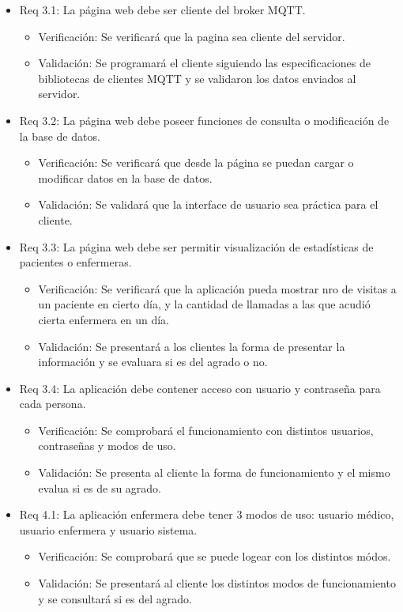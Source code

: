 \documentclass[
11pt, %
]{charter}
\begin{document}
\begin{itemize}
\item Req 3.1: La página web debe ser cliente del broker MQTT.
	\begin{itemize}
	\item Verificación: Se verificará que la pagina sea cliente del servidor.
	\item Validación:  Se programará el cliente siguiendo las especificaciones de bibliotecas de clientes MQTT y se validaron los datos enviados al servidor.
	\end{itemize}
\item Req 3.2: La página web debe poseer funciones de consulta o modificación de la base de datos.
	\begin{itemize}
	\item Verificación: Se verificará que desde la página se puedan cargar o modificar datos en la base de datos.
	\item Validación:  Se validará que la interface de usuario sea práctica para el cliente.
	\end{itemize}
\item Req 3.3: La página web debe ser permitir visualización de estadísticas de pacientes o enfermeras. 
	\begin{itemize}
	\item Verificación: Se verificará que la aplicación pueda mostrar nro de visitas a un paciente en cierto día, y la cantidad de llamadas a las que acudió cierta enfermera en un día.
	\item Validación:  Se presentará a los clientes la forma de presentar la información y se evaluara si es del agrado o no.
	\end{itemize}	
\item Req 3.4: La aplicación debe contener acceso con usuario y contraseña para cada persona. 
	\begin{itemize}
	\item Verificación: Se comprobará el funcionamiento con distintos usuarios, contraseñas y modos de uso.
	\item Validación:  Se presenta al cliente la forma de funcionamiento y el mismo evalua si es de su agrado.
	\end{itemize}		
\item Req 4.1: La aplicación enfermera debe tener 3 modos de uso: usuario médico, usuario enfermera y usuario sistema.
	\begin{itemize}
	\item Verificación: Se comprobará que se puede logear con los distintos módos.
	\item Validación: Se presentará al cliente los distintos modos de funcionamiento y se consultará si es del agrado.
	\end{itemize}		


\end{itemize}
\end{document}
